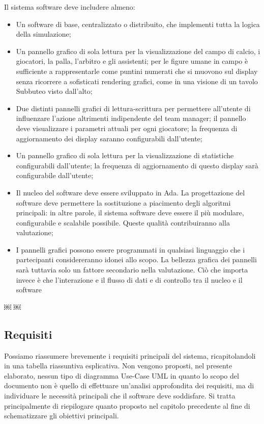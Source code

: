 \documentclass[aps,letterpaper,10pt]{article}
\begin{document}
Il sistema software deve includere almeno:
\begin{itemize}
	\item Un software di base, centralizzato o distribuito, che implementi tutta la logica della simulazione;
	\item Un pannello grafico di sola lettura per la visualizzazione del campo di calcio, i giocatori, la palla, l'arbitro e gli assistenti; per le figure umane in campo \`e sufficiente a rappresentarle come puntini numerati che si muovono sul display senza ricorrere a sofisticati rendering grafici, come in una visione di un tavolo Subbuteo visto dall'alto;
	\item Due distinti pannelli grafici di lettura-scrittura per permettere all'utente di influenzare l'azione altrimenti indipendente del team manager; il pannello deve visualizzare i parametri attuali per ogni giocatore; la frequenza di aggiornamento dei display saranno configurabili dall'utente;
	\item Un pannello grafico di sola lettura per la visualizzazione di statistiche configurabili dall'utente; la frequenza di aggiornamento di questo display sar\`a configurabile dall'utente;
	\item Il nucleo del software deve essere sviluppato in Ada. La progettazione del software deve permettere la sostituzione a piacimento degli algoritmi principali: in altre parole, il sistema software deve essere il pi\`u modulare, configurabile e scalabile possibile. Queste qualit\`a contribuiranno alla valutazione;
	\item I pannelli grafici possono essere programmati in qualsiasi linguaggio che i partecipanti considereranno idonei allo scopo. La bellezza grafica dei pannelli sar\`a tuttavia solo un fattore secondario nella valutazione. Ci\`o che importa invece \`e che l'interazione e il flusso di dati e di controllo tra il nucleo e il software
\end{itemize}
￼ ￼
\subsection{Requisiti} 

Possiamo riassumere brevemente i requisiti principali del sistema, ricapitolandoli in una tabella riassuntiva esplicativa. Non vengono proposti, nel presente elaborato, nessun tipo di diagramma Use-Case UML in quanto lo scopo del documento non \`e quello di effettuare un'analisi approfondita dei requisiti, ma di individuare le necessit\`a principali che il software deve soddisfare. Si tratta principalmente di riepilogare quanto proposto nel capitolo precedente al fine di schematizzare gli obiettivi principali.
\end{document}
